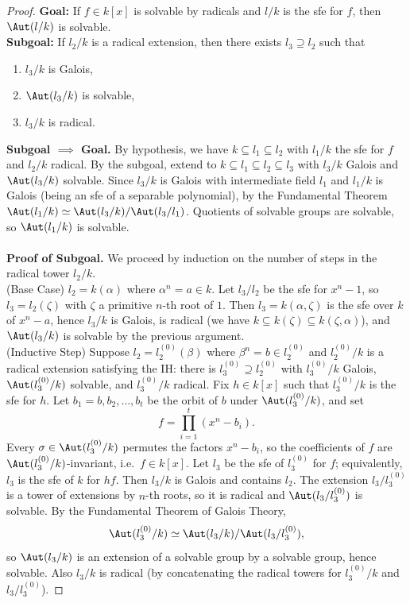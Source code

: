 \documentclass[a4paper,12pt]{article}
\begin{document}
\begin{proof}
    \textbf{Goal:} If $f\in k[x]$ is solvable by radicals and $l/k$ is the sfe for $f$, then $\Aut(l/k)$ is solvable.\\
    \textbf{Subgoal:} If $l_2/k$ is a radical extension, then there exists $l_3\supseteq l_2$ such that 
    \begin{enumerate}
        \item $l_3/k$ is Galois,
        \item $\Aut(l_3/k)$ is solvable,
        \item $l_3/k$ is radical.
    \end{enumerate}
    \textbf{Subgoal $\implies$ Goal.} By hypothesis, we have $k\subseteq l_1\subseteq l_2$ with $l_1/k$ the sfe for $f$ and $l_2/k$ radical. By the subgoal, extend to $k\subseteq l_1\subseteq l_2\subseteq l_3$ with $l_3/k$ Galois and $\Aut(l_3/k)$ solvable. Since $l_3/k$ is Galois with intermediate field $l_1$ and $l_1/k$ is Galois (being an sfe of a separable polynomial), by the Fundamental Theorem $\Aut(l_1/k)\simeq \Aut(l_3/k)/\Aut(l_3/l_1)$. Quotients of solvable groups are solvable, so $\Aut(l_1/k)$ is solvable.\\\\
    \textbf{Proof of Subgoal.} We proceed by induction on the number of steps in the radical tower $l_2/k$.\\
    (Base Case) $l_2=k(\alpha)$ where $\alpha^n=a\in k$. Let $l_3/l_2$ be the sfe for $x^n-1$, so $l_3=l_2(\zeta)$ with $\zeta$ a primitive $n$-th root of $1$. Then $l_3=k(\alpha,\zeta)$ is the sfe over $k$ of $x^n-a$, hence $l_3/k$ is Galois, is radical (we have $k\subseteq k(\zeta)\subseteq k(\zeta,\alpha)$), and $\Aut(l_3/k)$ is solvable by the previous argument.\\
    (Inductive Step) Suppose $l_2=l_2^{(0)}(\beta)$ where $\beta^n=b\in l_2^{(0)}$ and $l_2^{(0)}/k$ is a radical extension satisfying the IH: there is $l_3^{(0)}\supseteq l_2^{(0)}$ with $l_3^{(0)}/k$ Galois, $\Aut(l_3^{(0)}/k)$ solvable, and $l_3^{(0)}/k$ radical. Fix $h\in k[x]$ such that $l_3^{(0)}/k$ is the sfe for $h$. Let $b_1=b,b_2,\dots,b_t$ be the orbit of $b$ under $\Aut(l_3^{(0)}/k)$, and set
    \[
    f=\prod_{i=1}^t(x^n-b_i).
    \]
    Every $\sigma\in \Aut(l_3^{(0)}/k)$ permutes the factors $x^n-b_i$, so the coefficients of $f$ are $\Aut(l_3^{(0)}/k)$-invariant, i.e.\ $f\in k[x]$. Let $l_3$ be the sfe of $l_3^{(0)}$ for $f$; equivalently, $l_3$ is the sfe of $k$ for $hf$. Then $l_3/k$ is Galois and contains $l_2$. The extension $l_3/l_3^{(0)}$ is a tower of extensions by $n$-th roots, so it is radical and $\Aut(l_3/l_3^{(0)})$ is solvable. By the Fundamental Theorem of Galois Theory,
    \[
    \Aut(l_3^{(0)}/k)\simeq \Aut(l_3/k)/\Aut(l_3/l_3^{(0)}),
    \]
    so $\Aut(l_3/k)$ is an extension of a solvable group by a solvable group, hence solvable. Also $l_3/k$ is radical (by concatenating the radical towers for $l_3^{(0)}/k$ and $l_3/l_3^{(0)}$).
\end{proof}
\end{document}
